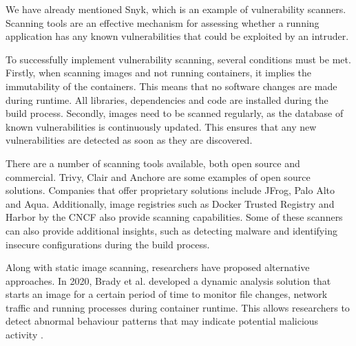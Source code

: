 We have already mentioned Snyk, which is an example of vulnerability scanners. Scanning tools are an effective mechanism for assessing whether a running application has any known vulnerabilities that could be exploited by an intruder.

To successfully implement vulnerability scanning, several conditions must be met. Firstly, when scanning images and not running containers, it implies the immutability of the containers. This means that no software changes are made during runtime. All libraries, dependencies and code are installed during the build process. Secondly, images need to be scanned regularly, as the database of known vulnerabilities is continuously updated. This ensures that any new vulnerabilities are detected as soon as they are discovered.

There are a number of scanning tools available, both open source and commercial. Trivy, Clair and Anchore are some examples of open source solutions. Companies that offer proprietary solutions include JFrog, Palo Alto and Aqua. Additionally, image registries such as Docker Trusted Registry and Harbor by the CNCF also provide scanning capabilities. Some of these scanners can also provide additional insights, such as detecting malware and identifying insecure configurations during the build process.

Along with static image scanning, researchers have proposed alternative approaches. In 2020, Brady et al. developed a dynamic analysis solution that starts an image for a certain period of time to monitor file changes, network traffic and running processes during container runtime. This allows researchers to detect abnormal behaviour patterns that may indicate potential malicious activity \cite{c:15}.
